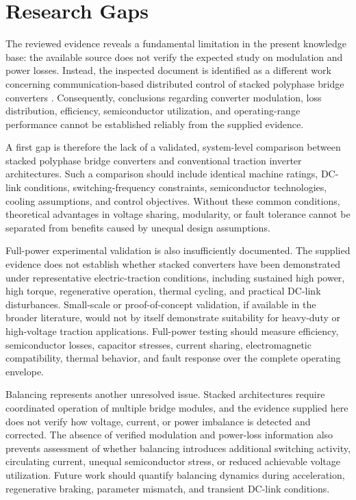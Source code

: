 \section{Research Gaps}

The reviewed evidence reveals a fundamental limitation in the present knowledge base: the available source does not verify the expected study on modulation and power losses. Instead, the inspected document is identified as a different work concerning communication-based distributed control of stacked polyphase bridge converters \cite{Jin2017}. Consequently, conclusions regarding converter modulation, loss distribution, efficiency, semiconductor utilization, and operating-range performance cannot be established reliably from the supplied evidence.

A first gap is therefore the lack of a validated, system-level comparison between stacked polyphase bridge converters and conventional traction inverter architectures. Such a comparison should include identical machine ratings, DC-link conditions, switching-frequency constraints, semiconductor technologies, cooling assumptions, and control objectives. Without these common conditions, theoretical advantages in voltage sharing, modularity, or fault tolerance cannot be separated from benefits caused by unequal design assumptions. %

Full-power experimental validation is also insufficiently documented. The supplied evidence does not establish whether stacked converters have been demonstrated under representative electric-traction conditions, including sustained high power, high torque, regenerative operation, thermal cycling, and practical DC-link disturbances. Small-scale or proof-of-concept validation, if available in the broader literature, would not by itself demonstrate suitability for heavy-duty or high-voltage traction applications. Full-power testing should measure efficiency, semiconductor losses, capacitor stresses, current sharing, electromagnetic compatibility, thermal behavior, and fault response over the complete operating envelope. %

Balancing represents another unresolved issue. Stacked architectures require coordinated operation of multiple bridge modules, and the evidence supplied here does not verify how voltage, current, or power imbalance is detected and corrected. The absence of verified modulation and power-loss information also prevents assessment of whether balancing introduces additional switching activity, circulating current, unequal semiconductor stress, or reduced achievable voltage utilization. Future work should quantify balancing dynamics during acceleration, regenerative braking, parameter mismatch, and transient DC-link conditions. %

